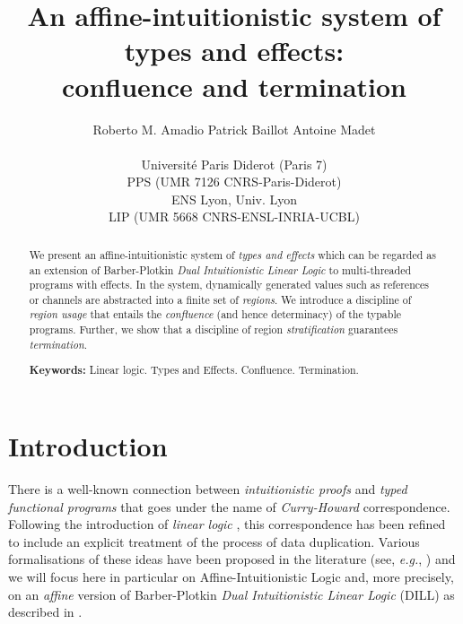\documentclass[11pt]{article}
\begin{document}
 
 
\title{An affine-intuitionistic system of types and effects: \\
       confluence and termination}

\author{Roberto M. Amadio 
\quad  Patrick Baillot \quad
 Antoine Madet \\ \\
{\footnotesize  Universit\'e Paris Diderot (Paris 7)} \\
{\footnotesize PPS (UMR 7126 CNRS-Paris-Diderot)} \\ 
{\footnotesize  ENS  Lyon, Univ. Lyon} \\
{\footnotesize LIP (UMR 5668 CNRS-ENSL-INRIA-UCBL)} }



\maketitle 

\begin{abstract}
We present an affine-intuitionistic system of {\em types and effects} which
can be regarded as an extension  of Barber-Plotkin {\em Dual Intuitionistic Linear Logic}
to multi-threaded programs with effects. In the
system, dynamically generated values such as references or channels are
abstracted into a finite set of {\em regions}.  We introduce a discipline of
{\em region usage} that entails the {\em confluence} (and hence determinacy) of the
typable programs.  Further, we show that a discipline of region
{\em stratification} guarantees {\em termination}.

{\bf Keywords:} Linear logic. Types and Effects. Confluence. Termination.
\end{abstract}


\section{Introduction}\label{intro-sec}
There is a well-known connection between {\em
intuitionistic proofs} and {\em typed functional programs} that goes
under the name of {\em Curry-Howard} correspondence.  Following the
introduction of {\em linear logic} \cite{Girard87}, this correspondence has
been refined to include an explicit treatment of the process of data
duplication.  Various formalisations of these ideas have been proposed
in the literature (see, {\em e.g.}, \cite{BBPH93,Benton94,Plotkin93,MOTW95,Barber96}) 
and we will focus here in particular on Affine-Intuitionistic Logic and,
more precisely, on an {\em affine} version of Barber-Plotkin {\em Dual Intuitionistic
Linear Logic} (DILL) as described in \cite{Barber96}. 
\end{document}
